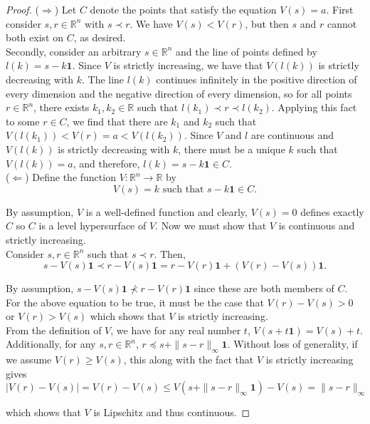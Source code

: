 \documentclass{article}
\begin{document}
\begin{proof}
($\Longrightarrow$)
Let $C$ denote the points that satisfy the equation $V(s) = a$. First consider $s, r \in \mathbb R^n$ with $s \prec r$. We have $V(s) < V(r)$, but then $s$ and $r$ cannot both exist on $C$, as desired.\\

Secondly, consider an arbitrary $s \in \mathbb R^n$ and the line of points defined by $l(k) = s - k \bm 1$. Since $V$ is strictly increasing, we have that $V(l(k))$ is strictly decreasing with $k$. The line $l(k)$ continues infinitely in the positive direction of every dimension and the negative direction of every dimension, so for all points $r \in \mathbb R^n$, there exists $k_1, k_2 \in \mathbb R$ such that $l(k_1) \prec r \prec l(k_2)$. Applying this fact to some $r \in C$, we find that there are $k_1$ and $k_2$ such that $V(l(k_1)) < V(r) = a < V(l(k_2))$. Since $V$ and $l$ are continuous and $V(l(k))$ is strictly decreasing with $k$, there must be a unique $k$ such that $V(l(k)) = a$, and therefore, $l(k) = s - k \bm 1 \in C$.\\

($\Longleftarrow$)
Define the function $V : \mathbb R^n \rightarrow \mathbb R$ by 
$$V(s) = k \text{ such that } s - k \bm 1 \in C.$$

By assumption, $V$ is a well-defined function and clearly, $V(s) = 0$ defines exactly $C$ so $C$ is a level hypersurface of $V$. Now we must show that $V$ is continuous and strictly increasing.\\

Consider $s, r \in \mathbb R^n$ such that $s \prec r$. Then, 
$$s - V(s) \bm 1 \prec r - V(s) \bm 1 = r - V(r)\bm 1 + (V(r) - V(s))\bm 1.$$

By assumption, $s - V(s) \bm 1 \not\prec r - V(r)\bm 1$ since these are both members of $C$. For the above equation to be true, it must be the case that $V(r) - V(s) > 0$ or $V(r) > V(s)$ which shows that $V$ is strictly increasing.\\

From the definition of $V$, we have for any real number $t$, $V(s + t \bm 1) = V(s) + t$. Additionally, for any $s, r \in \mathbb R^n$, $r \preceq s + \| s - r \|_\infty \bm 1$. Without loss of generality, if we assume $V(r) \geq V(s)$, this along with the fact that $V$ is strictly increasing gives
$$|V(r) - V(s)| = V(r) - V(s) \leq V(s+\| s - r \|_\infty \bm 1) - V(s) = \| s - r \|_\infty$$

which shows that $V$ is Lipschitz and thus continuous.
\end{proof}
\end{document}
